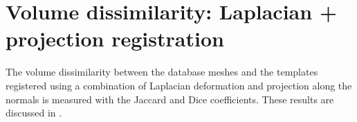 





\newpage
\section{Volume dissimilarity: Laplacian + projection registration}
\label{appendix:volume_final2database}


The volume dissimilarity between the database meshes \mr* and the templates registered using a combination of Laplacian deformation and projection along the normals \mw* is measured with the Jaccard and Dice coefficients. These results are discussed in . 





